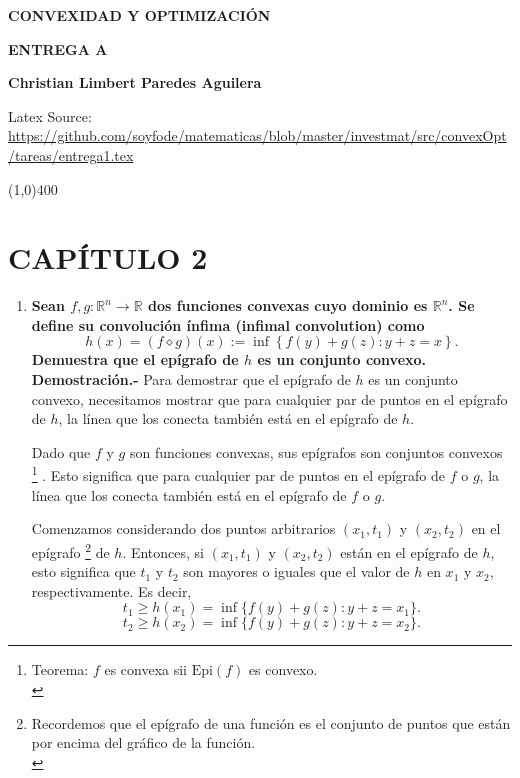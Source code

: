 \begin{center}
\textbf{CONVEXIDAD Y OPTIMIZACIÓN}

\textbf{\Large ENTREGA A}

\textbf{ \textbf{Christian Limbert Paredes Aguilera}}
\end{center}
\begin{center}
    Latex Source: \url{https://github.com/soyfode/matematicas/blob/master/investmat/src/convexOpt/tareas/entrega1.tex}
\end{center}

\line(1,0){400}


\section*{CAPÍTULO 2}

\begin{enumerate}

    \item \textbf{\boldmath Sean $f, g : \mathbb{R}^n\to \mathbb{R}$ dos funciones convexas cuyo dominio es $\mathbb{R}^n$. Se define su convolución ínfima (infimal convolution) como
    $$ h(x) = (f \diamond g)(x) := \inf\left\{f(y) + g(z) : y + z = x\right\}.$$
    Demuestra que el epígrafo de $h$ es un conjunto convexo.}\\

	\textbf{Demostración.-}\; Para demostrar que el epígrafo de $h$ es un conjunto convexo, necesitamos mostrar que para cualquier par de puntos en el epígrafo de $h$, la línea que los conecta también está en el epígrafo de $h$.

	Dado que $f$ y $g$ son funciones convexas, sus epígrafos son conjuntos convexos 
	\footnote{
	    Teorema: $f$ es convexa sii $\text{Epi}(f)$ es convexo.\\
	\label{teoEpiConvexo}}
	. Esto significa que para cualquier par de puntos en el epígrafo de $f$ o $g$, la línea que los conecta también está en el epígrafo de $f$ o $g$.

	Comenzamos considerando dos puntos arbitrarios $(x_1, t_1)$ y $(x_2, t_2)$ en el epígrafo
	\footnote{
	    Recordemos que el epígrafo de una función es el conjunto de puntos que están por encima del gráfico de la función.\\
	\label{epigrafo}}
	de $h$. Entonces, si $(x_1, t_1)$ y $(x_2, t_2)$ están en el epígrafo de $h$, esto significa que $t_1$ y $t_2$ son mayores o iguales que el valor de $h$ en $x_1$ y $x_2$, respectivamente. Es decir,
	$$t_1 \geq h(x_1) = \inf\{f(y) + g(z) : y + z = x_1\}.$$
	$$t_2 \geq h(x_2) = \inf\{f(y) + g(z) : y + z = x_2\}.$$


\end{enumerate}
